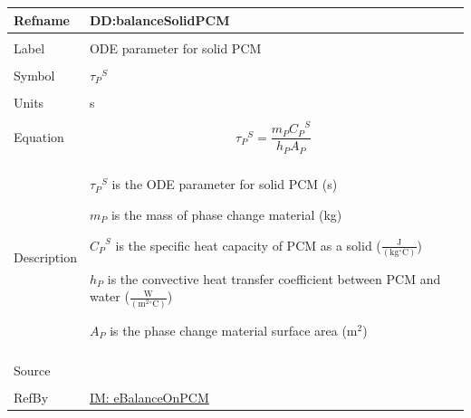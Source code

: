 \documentclass[12pt]{article}
\begin{document}
\noindent \begin{minipage}{\textwidth}
\begin{tabular}{p{} p{}}
\toprule \textbf{Refname} & \textbf{DD:balanceSolidPCM}
\label{DD:balanceSolidPCM}
\\ \midrule \\
Label & ODE parameter for solid PCM
\\ \midrule \\
Symbol & ${{τ_{P}}^{S}}$
\\ \midrule \\
Units & s
\\ \midrule \\
Equation & \begin{displaymath}
           {{τ_{P}}^{S}}=\frac{{m_{P}} {{C_{P}}^{S}}}{{h_{P}} {A_{P}}}
           \end{displaymath}
\\ \midrule \\
Description & \begin{symbDescription}
              \item{${{τ_{P}}^{S}}$ is the ODE parameter for solid PCM (s)}
              \item{${m_{P}}$ is the mass of phase change material (kg)}
              \item{${{C_{P}}^{S}}$ is the specific heat capacity of PCM as a solid ($\frac{\text{J}}{(\text{kg}{}^{\circ}\text{C})}$)}
              \item{${h_{P}}$ is the convective heat transfer coefficient between PCM and water ($\frac{\text{W}}{(\text{m}^{2}{}^{\circ}\text{C})}$)}
              \item{${A_{P}}$ is the phase change material surface area ($\text{m}^{2}$)}
              \end{symbDescription}
\\ \midrule \\
Source & \cite{lightstone2012}
\\ \midrule \\
RefBy & \hyperref[IM:eBalanceOnPCM]{IM: eBalanceOnPCM}
\\ \bottomrule \end{tabular}
\end{minipage}
\par~
\end{document}
